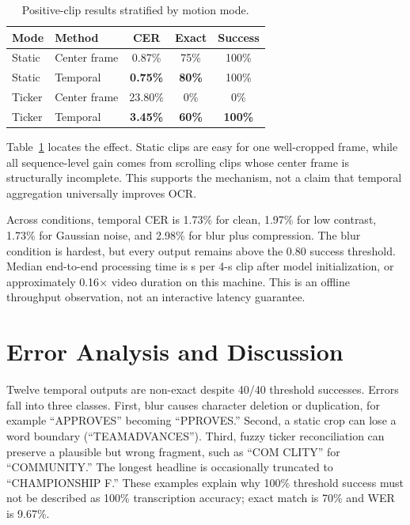 \documentclass[conference]{IEEEtran}
\begin{document}
\begin{table}[t]
\caption{Positive-clip results stratified by motion mode.}
\label{tab:mode}
\centering
\begin{tabular}{llccc}
\toprule
Mode & Method & CER & Exact & Success \\
\midrule
Static & Center frame & 0.87\% & 75\% & 100\% \\
Static & Temporal & \textbf{0.75\%} & \textbf{80\%} & 100\% \\
Ticker & Center frame & 23.80\% & 0\% & 0\% \\
Ticker & Temporal & \textbf{3.45\%} & \textbf{60\%} & \textbf{100\%} \\
\bottomrule
\end{tabular}
\end{table}

Table~\ref{tab:mode} locates the effect.  Static clips are easy for one well-cropped frame, while
all sequence-level gain comes from scrolling clips whose center frame is structurally incomplete.
This supports the mechanism, not a claim that temporal aggregation universally improves OCR.

Across conditions, temporal CER is 1.73\% for clean, 1.97\% for low contrast, 1.73\% for Gaussian
noise, and 2.98\% for blur plus compression.  The blur condition is hardest, but every output
remains above the 0.80 success threshold.  Median end-to-end processing time is
\MedianRuntime{} s per 4-s clip after model initialization, or approximately 0.16$\times$ video
duration on this machine.  This is an offline throughput observation, not an interactive latency
guarantee.

\section{Error Analysis and Discussion}

Twelve temporal outputs are non-exact despite 40/40 threshold successes.  Errors fall into three
classes.  First, blur causes character deletion or duplication, for example ``APPROVES'' becoming
``PPROVES.''  Second, a static crop can lose a word boundary (``TEAMADVANCES'').  Third, fuzzy
ticker reconciliation can preserve a plausible but wrong fragment, such as ``COM CLITY'' for
``COMMUNITY.''  The longest headline is occasionally truncated to ``CHAMPIONSHIP F.''  These
examples explain why 100\% threshold success must not be described as 100\% transcription
accuracy; exact match is 70\% and WER is 9.67\%.
\end{document}

